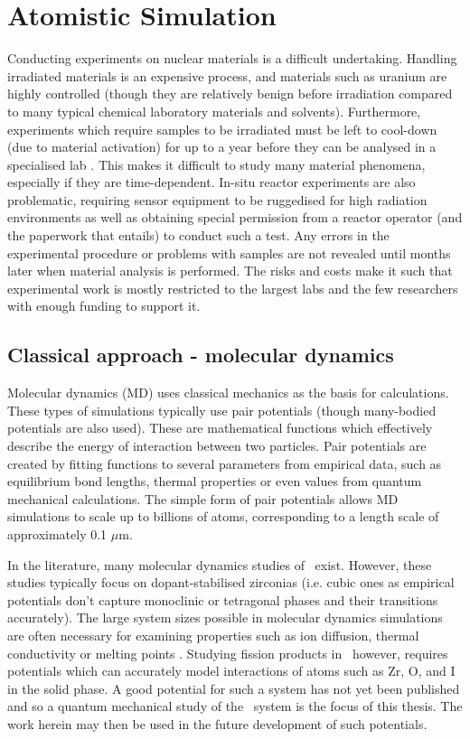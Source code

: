 \section{Atomistic Simulation}

Conducting experiments on nuclear materials is a difficult undertaking. Handling irradiated materials is an expensive process, and materials such as uranium are highly controlled (though they are relatively benign before irradiation compared to many typical chemical laboratory materials and solvents). Furthermore, experiments which require samples to be irradiated must be left to cool-down (due to material activation) for up to a year before they can be analysed in a specialised lab \cite{efthymiopoulos2011hiradmat}. This makes it difficult to study many material phenomena, especially if they are time-dependent. In-situ reactor experiments are also problematic, requiring sensor equipment to be ruggedised for high radiation environments as well as obtaining special permission from a reactor operator (and the paperwork that entails) to conduct  such a test. Any errors in the experimental procedure or problems with samples are not revealed until months later when material analysis is performed. The risks and costs make it such that experimental work is mostly restricted to the largest labs and the few researchers with enough funding to support it.



\subsection{Classical approach - molecular dynamics}

Molecular dynamics (MD) uses classical mechanics as the basis for calculations. These types of simulations typically use pair potentials (though many-bodied potentials are also used). These are mathematical functions which effectively describe the energy of interaction between two particles. Pair potentials are created by fitting functions to several parameters from empirical data, such as equilibrium bond lengths, thermal properties or even values from quantum mechanical calculations. The simple form of pair potentials allows MD simulations to scale up to billions of atoms, corresponding to a length scale of approximately 0.1 $\mu$m. 

In the literature, many molecular dynamics studies of \zirconia\ exist. However, these studies typically focus on dopant-stabilised zirconias (i.e. cubic ones as empirical potentials don't capture monoclinic or tetragonal phases and their transitions accurately). The large system sizes possible in molecular dynamics simulations are often necessary for examining properties such as ion diffusion, thermal conductivity or melting points \cite{Davis2010}. Studying fission products in \zirconia\ however, requires potentials which can accurately model interactions of atoms such as Zr, O, and I in the solid phase. A good potential for such a system has not yet been published and so a quantum mechanical study of the \zirconia\ system is the focus of this thesis. The work herein may then be used in the future development of such potentials.

